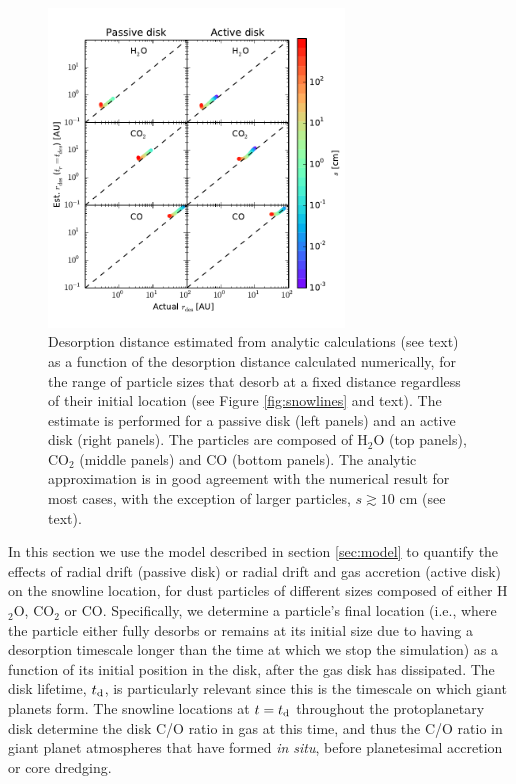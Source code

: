 \documentclass[apj]{emulateapj}
\begin{document}
\begin{figure}[t!]
\centering
\includegraphics[width=0.7\textwidth]{desorption_distance_actual_vs_estimated_passive_active_new.pdf}
\caption{Desorption distance estimated from analytic calculations (see text) as a function of the desorption distance calculated numerically, for the range of particle sizes that desorb at a fixed distance regardless of their initial location (see Figure \ref{fig:snowlines} and text). The estimate is performed for a passive disk (left panels) and an active disk (right panels).  The particles are composed of H$_2$O (top panels), CO$_2$ (middle panels) and CO (bottom panels). The analytic approximation is in good agreement with the numerical result for most cases, with the exception of larger particles, $s \gtrsim 10$ cm (see text).}
\label{fig:an_vs_actual}
\end{figure}

In this section we use the model described in section \ref{sec:model} to quantify the effects of radial drift (passive disk) or radial drift and gas accretion (active disk) on the snowline location, for dust particles of different sizes composed of either H$_2$O, CO$_2$ or CO. Specifically, we determine a particle's final location (i.e., where the particle either fully desorbs or remains at its initial size due to having a desorption timescale longer than the time at which we stop the simulation) as a function of its initial position in the disk, after the gas disk has dissipated. The disk lifetime, $t_{\rm d}$, is particularly relevant since this is the timescale on which giant planets form. The snowline locations at $t=t_{\rm d}$ throughout the protoplanetary disk determine the disk C/O ratio in gas at this time, and thus the C/O ratio in giant planet atmospheres that have formed \textit{in situ}, before planetesimal accretion or core dredging.   
\end{document}

